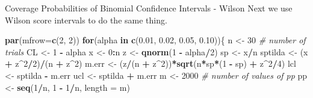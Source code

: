 \documentclass[
  ignorenonframetext,
]{beamer}
\newenvironment{Shaded}{\begin{snugshade}}{\end{snugshade}}
\newcommand{\AttributeTok}[1]{\textcolor[rgb]{0.13,0.29,0.53}{#1}}
\newcommand{\CommentTok}[1]{\textcolor[rgb]{0.56,0.35,0.01}{\textit{#1}}}
\newcommand{\ControlFlowTok}[1]{\textcolor[rgb]{0.13,0.29,0.53}{\textbf{#1}}}
\newcommand{\DecValTok}[1]{\textcolor[rgb]{0.00,0.00,0.81}{#1}}
\newcommand{\FloatTok}[1]{\textcolor[rgb]{0.00,0.00,0.81}{#1}}
\newcommand{\FunctionTok}[1]{\textcolor[rgb]{0.13,0.29,0.53}{\textbf{#1}}}
\newcommand{\NormalTok}[1]{#1}
\newcommand{\OtherTok}[1]{\textcolor[rgb]{0.56,0.35,0.01}{#1}}
\newcommand{\SpecialCharTok}[1]{\textcolor[rgb]{0.81,0.36,0.00}{\textbf{#1}}}
\begin{document}
\begin{frame}[fragile]{Coverage Probabilities of Binomial Confidence
Intervals - Wilson}
\label{coverage-probabilities-of-binomial-confidence-intervals---wilson}
Next we use Wilson score intervals to do the same thing.

\tiny

\begin{Shaded}
\begin{Highlighting}[]
\FunctionTok{par}\NormalTok{(}\AttributeTok{mfrow=}\FunctionTok{c}\NormalTok{(}\DecValTok{2}\NormalTok{, }\DecValTok{2}\NormalTok{))}
\ControlFlowTok{for}\NormalTok{(alpha }\ControlFlowTok{in} \FunctionTok{c}\NormalTok{(}\FloatTok{0.01}\NormalTok{, }\FloatTok{0.02}\NormalTok{, }\FloatTok{0.05}\NormalTok{, }\FloatTok{0.10}\NormalTok{))\{}
\NormalTok{n }\OtherTok{\textless{}{-}} \DecValTok{30}     \CommentTok{\# number of trials}
\NormalTok{CL }\OtherTok{\textless{}{-}} \DecValTok{1} \SpecialCharTok{{-}}\NormalTok{ alpha}
\NormalTok{x }\OtherTok{\textless{}{-}} \DecValTok{0}\SpecialCharTok{:}\NormalTok{n }
\NormalTok{z }\OtherTok{\textless{}{-}} \FunctionTok{qnorm}\NormalTok{(}\DecValTok{1} \SpecialCharTok{{-}}\NormalTok{ alpha}\SpecialCharTok{/}\DecValTok{2}\NormalTok{)}
\NormalTok{sp }\OtherTok{\textless{}{-}}\NormalTok{ x}\SpecialCharTok{/}\NormalTok{n}
\NormalTok{sptilda }\OtherTok{\textless{}{-}}\NormalTok{ (x }\SpecialCharTok{+}\NormalTok{ z}\SpecialCharTok{\^{}}\DecValTok{2}\SpecialCharTok{/}\DecValTok{2}\NormalTok{)}\SpecialCharTok{/}\NormalTok{(n }\SpecialCharTok{+}\NormalTok{ z}\SpecialCharTok{\^{}}\DecValTok{2}\NormalTok{)}
\NormalTok{m.err }\OtherTok{\textless{}{-}}\NormalTok{ (z}\SpecialCharTok{/}\NormalTok{(n }\SpecialCharTok{+}\NormalTok{ z}\SpecialCharTok{\^{}}\DecValTok{2}\NormalTok{))}\SpecialCharTok{*}\FunctionTok{sqrt}\NormalTok{(n}\SpecialCharTok{*}\NormalTok{sp}\SpecialCharTok{*}\NormalTok{(}\DecValTok{1} \SpecialCharTok{{-}}\NormalTok{ sp) }\SpecialCharTok{+}\NormalTok{ z}\SpecialCharTok{\^{}}\DecValTok{2}\SpecialCharTok{/}\DecValTok{4}\NormalTok{)}
\NormalTok{lcl }\OtherTok{\textless{}{-}}\NormalTok{ sptilda }\SpecialCharTok{{-}}\NormalTok{ m.err}
\NormalTok{ucl }\OtherTok{\textless{}{-}}\NormalTok{ sptilda }\SpecialCharTok{+}\NormalTok{ m.err}
\NormalTok{m }\OtherTok{\textless{}{-}} \DecValTok{2000} \CommentTok{\# number of values of pp}
\NormalTok{pp }\OtherTok{\textless{}{-}} \FunctionTok{seq}\NormalTok{(}\DecValTok{1}\SpecialCharTok{/}\NormalTok{n, }\DecValTok{1} \SpecialCharTok{{-}} \DecValTok{1}\SpecialCharTok{/}\NormalTok{n, }\AttributeTok{length =}\NormalTok{ m)}

\end{Highlighting}
\end{Shaded}
\end{frame}
\end{document}
